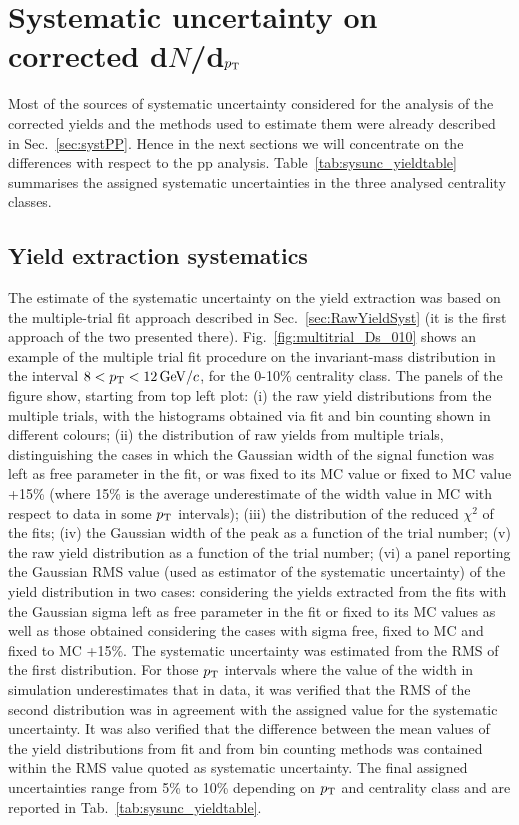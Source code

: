 \section{Systematic uncertainty on corrected d$N$/d$p_{\rm T}$}
\label{sec:systematics}
Most of the sources of systematic uncertainty considered for the analysis 
of the corrected yields and the methods used to estimate them were already described in Sec.~\ref{sec:systPP}. 
Hence in the next sections we will concentrate on the differences with respect to the 
pp analysis. Table~\ref{tab:sysunc_yieldtable} summarises the 
assigned systematic uncertainties in the three analysed centrality classes.

\subsection{Yield extraction systematics}
\label{sec:YieldExsystAA}
The estimate of the systematic uncertainty on the yield extraction
was based on the multiple-trial fit approach described in Sec.~\ref{sec:RawYieldSyst}
(it is the first approach of the two presented there).
Fig.~\ref{fig:multitrial_Ds_010} shows an example of the multiple trial fit procedure on the invariant-mass
distribution in the interval $8 < p_{\rm T} < 12 \, \mathrm{GeV}/c$, for the 0-10\% centrality class.
The panels of the figure show, starting from top left plot:
(i) the raw yield distributions from the multiple trials,
with the histograms obtained via fit and bin counting shown
in different colours; (ii) the distribution of raw yields from multiple 
trials, distinguishing the cases in which the Gaussian width of the signal function was left as free parameter 
in the fit, or was fixed to its MC value or fixed to MC value +15\% (where
15\% is the average underestimate of the width value in MC with respect to data in some
$p_{\rm T}$ intervals); 
(iii) the distribution of the reduced $\chi^{2}$ of the fits; 
(iv) the Gaussian width of the peak as a function of the trial 
number; (v) the raw yield distribution as a 
function of the trial number; (vi) a panel reporting the Gaussian RMS value (used as
estimator of the systematic uncertainty) of the yield distribution
in two cases: considering the yields extracted from the fits with 
the Gaussian sigma left as free parameter in the fit or fixed to its MC values
as well as those obtained considering the cases with sigma free, fixed to MC and fixed to 
MC +15\%. The systematic uncertainty was estimated from the RMS
of the first distribution. For those $p_{\rm T}$ intervals where the value of the width in 
simulation underestimates that in data, it was verified that
the RMS of the second distribution was in agreement with the assigned value for the
systematic uncertainty. 
It was also verified that the difference between the mean values of the yield distributions from fit
and from bin counting methods was contained within the RMS value quoted 
as systematic uncertainty.
The final assigned uncertainties range from 5\% to 10\% depending on $p_{\rm T}$ and
centrality class and are reported in Tab.~\ref{tab:sysunc_yieldtable}. 




